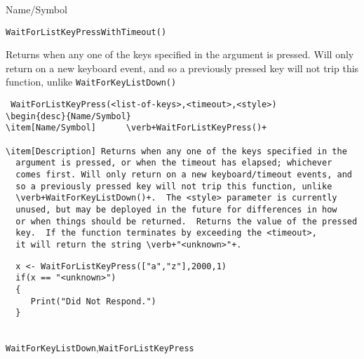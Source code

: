 \rl





\begin{desc}{Name/Symbol}
\item[Name/Symbol]  	\verb+WaitForListKeyPressWithTimeout()+

\item[Description] Returns when any one of the keys specified in the
  argument is pressed. Will only return on a new keyboard event, and
  so a previously pressed key will not trip this function, unlike \verb+WaitForKeyListDown()+

\item[Usage]
\begin{verbatim}
 WaitForListKeyPress(<list-of-keys>,<timeout>,<style>)
\begin{desc}{Name/Symbol}
\item[Name/Symbol]  	\verb+WaitForListKeyPress()+

\item[Description] Returns when any one of the keys specified in the
  argument is pressed, or when the timeout has elapsed; whichever
  comes first. Will only return on a new keyboard/timeout events, and
  so a previously pressed key will not trip this function, unlike
  \verb+WaitForKeyListDown()+.  The <style> parameter is currently
  unused, but may be deployed in the future for differences in how
  or when things should be returned.  Returns the value of the pressed
  key.  If the function terminates by exceeding the <timeout>,
  it will return the string \verb+"<unknown>"+.
\end{verbatim}

\item[Example]     	
\begin{verbatim}
  x <- WaitForListKeyPress(["a","z"],2000,1)
  if(x == "<unknown>") 
  {
     Print("Did Not Respond.")
  }
   
\end{verbatim}

\item[See Also]	
   \verb+WaitForKeyListDown+,\verb+WaitForListKeyPress+
 \end{desc}

\rl





